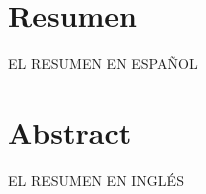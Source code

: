 \chapter*{Resumen}
\thispagestyle{empty}
EL RESUMEN EN ESPAÑOL

\thispagestyle{empty}

\chapter*{Abstract}
\thispagestyle{empty}
EL RESUMEN EN INGLÉS
